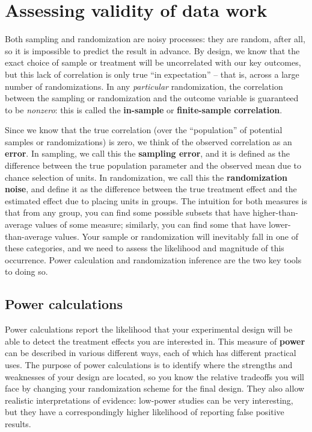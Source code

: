 
\section{Assessing validity of data work}

Both sampling and randomization are noisy processes:
they are random, after all, so it is impossible to predict the result in advance.
By design, we know that the exact choice of sample or treatment
will be uncorrelated with our key outcomes,
but this lack of correlation is only true ``in expectation'' --
that is, across a large number of randomizations.
In any \textit{particular} randomization,
the correlation between the sampling or randomization and the outcome variable
is guaranteed to be \textit{nonzero}:
this is called the \textbf{in-sample} or \textbf{finite-sample correlation}.

Since we know that the true correlation
(over the ``population'' of potential samples or randomizations)
is zero, we think of the observed correlation as an \textbf{error}.
In sampling, we call this the \textbf{sampling error},
and it is defined as the difference between the true population parameter
and the observed mean due to chance selection of units.
In randomization, we call this the \textbf{randomization noise},
and define it as the difference between the true treatment effect
and the estimated effect due to placing units in groups.
The intuition for both measures is that from any group,
you can find some possible subsets that have higher-than-average values of some measure;
similarly, you can find some that have lower-than-average values.
Your sample or randomization will inevitably fall in one of these categories,
and we need to assess the likelihood and magnitude of this occurrence.
Power calculation and randomization inference are the two key tools to doing so.

\subsection{Power calculations}

Power calculations report the likelihood that your experimental design
will be able to detect the treatment effects you are interested in.
This measure of \textbf{power} can be described in various different ways,
each of which has different practical uses.
The purpose of power calculations is to identify where the strengths and weaknesses
of your design are located, so you know the relative tradeoffs you will face
by changing your randomization scheme for the final design.
They also allow realistic interpretations of evidence:
low-power studies can be very interesting,
but they have a correspondingly higher likelihood
of reporting false positive results.

